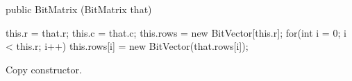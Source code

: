 \begin{htmlonly}
\end{htmlonly}
\begin{code}

   public BitMatrix (BitMatrix that) \begin{hide} {
      this.r = that.r;
      this.c = that.c;
      this.rows = new BitVector[this.r];
      for(int i = 0; i < this.r; i++)
         this.rows[i] = new BitVector(that.rows[i]);
   } \end{hide}
\end{code}
\begin{tabb} Copy constructor.
\end{tabb}
\begin{htmlonly}
\end{htmlonly}

